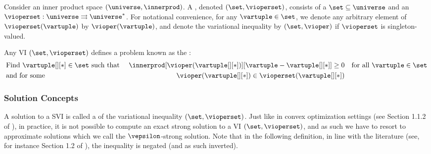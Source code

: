 Consider an inner product space $(\universe, \innerprod)$. A , denoted $(\set, \vioperset)$, consists of a  $\set \subseteq \universe$ and an  $\vioperset: \universe \rightrightarrows \universe^*$. For notational convenience, for any $\vartuple \in \set$, we denote any arbitrary element of $\vioperset(\vartuple)$ by $\vioper(\vartuple)$, and denote the variational inequality by $(\set, \vioper)$ if $\vioperset$ is singleton-valued.

Any VI $(\set, \vioperset)$ defines a problem known as the 
 \cite{lions1967variational}: 
\begin{align}
        &\text{Find } \vartuple[][*] \in \set \text{ such that } &\innerprod[{\vioper(\vartuple[][*])}][{\vartuple - \vartuple[][*]}] \geq 0 && \text{for all } \vartuple \in \set\\
        &\text{and for some } &\vioper(\vartuple[][*]) \in \vioperset(\vartuple[][*])
\end{align}

\subsubsection{Solution Concepts}
A solution to a SVI is called a  of the variational inequality $(\set, \vioperset)$. Just like in convex optimization settings (see Section 1.1.2 of \citet{nesterov1998introductory}), in practice, it is not possible to compute an exact strong solution to a VI $(\set, \vioperset)$, and as such we have to resort to approximate solutions which we call the $\vepsilon$-strong solution. Note that in the following definition, in line with the literature (see, for instance Section 1.2 of \citet{diakonikolas2020halpern}), the inequality is negated (and as such inverted). 
\fi

